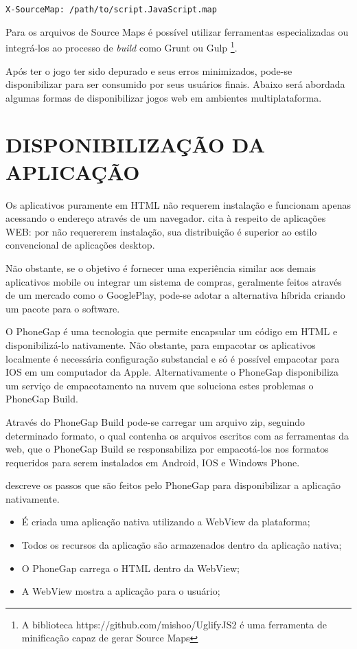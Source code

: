 \begin{verbatim}
X-SourceMap: /path/to/script.JavaScript.map
\end{verbatim}

Para os arquivos de Source Maps é possível utilizar ferramentas
especializadas ou integrá-los ao processo de \textit{build} como Grunt ou Gulp
\footnote{A biblioteca https://github.com/mishoo/UglifyJS2 é uma
ferramenta de minificação capaz de gerar Source Maps}.

Após ter o jogo ter sido depurado e seus erros minimizados, pode-se
disponibilizar para ser consumido por seus usuários finais.
Abaixo será abordada algumas formas de disponibilizar jogos web em
ambientes multiplataforma.
\section{DISPONIBILIZAÇÃO DA APLICAÇÃO} %

Os aplicativos puramente em HTML não requerem instalação e
funcionam apenas acessando o endereço através de um navegador.
\autocite{browserGamesTechnologyAndFuture} cita à respeito de
aplicações WEB: por não requererem instalação, sua distribuição é
superior ao estilo convencional de aplicações desktop.

Não obstante, se o objetivo é fornecer uma experiência similar aos
demais aplicativos mobile ou integrar um sistema de compras, geralmente
feitos através de um mercado como o GooglePlay, pode-se adotar a
alternativa híbrida criando um pacote para o software.

O PhoneGap é uma tecnologia que permite encapsular um código em
HTML e disponibilizá-lo nativamente. Não obstante, para empacotar
os aplicativos localmente é necessária configuração substancial
e só é possível empacotar para IOS em um computador da Apple.
Alternativamente o PhoneGap disponibiliza um serviço de empacotamento
na nuvem que soluciona estes problemas o PhoneGap Build.

Através do PhoneGap Build pode-se carregar um arquivo zip, seguindo
determinado formato, o qual contenha os arquivos escritos com as
ferramentas da web, que o PhoneGap Build se responsabiliza por
empacotá-los nos formatos requeridos para serem instalados em Android,
IOS e Windows Phone.

\cite{publishHtml5} descreve os passos que são feitos pelo PhoneGap para 
disponibilizar a aplicação nativamente.

\begin{itemize}
\item É criada uma aplicação nativa utilizando a WebView da plataforma;
\item Todos os recursos da aplicação são armazenados dentro da aplicação nativa;
\item O PhoneGap carrega o HTML dentro da WebView;
\item A WebView mostra a aplicação para o usuário;
\end{itemize}


